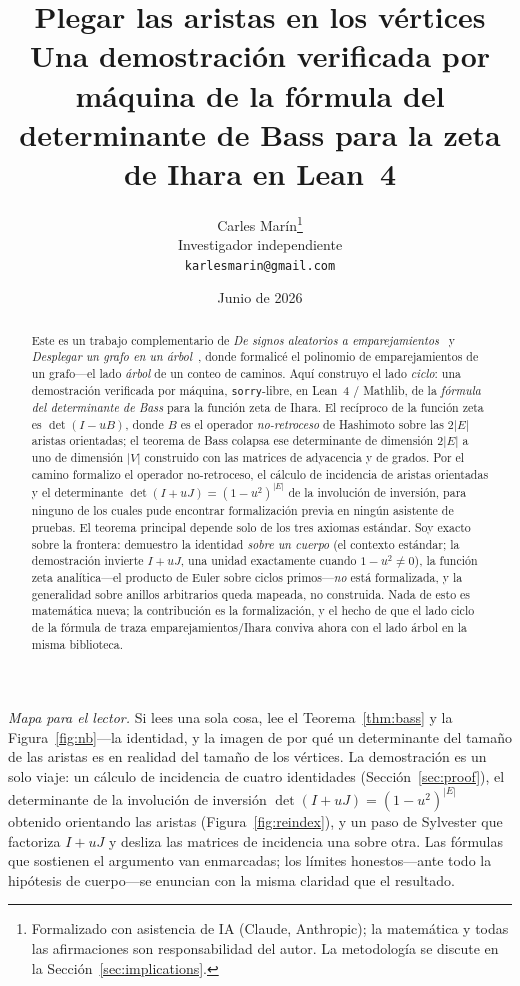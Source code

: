 \documentclass[11pt]{article}
\title{\bf Plegar las aristas en los v\'ertices\\[4pt]
  \large\normalfont Una demostraci\'on verificada por m\'aquina de la f\'ormula del determinante de Bass para la zeta de Ihara en Lean~4}
\author{Carles Mar\'in\thanks{Formalizado con asistencia de IA (Claude, Anthropic); la matem\'atica y todas las afirmaciones son responsabilidad del autor. La metodolog\'ia se discute en la Secci\'on~\ref{sec:implications}.}\\[3pt]
  \normalsize Investigador independiente\\
  \normalsize \texttt{karlesmarin@gmail.com}}
\date{Junio de 2026}
\newcommand{\lean}[1]{\texttt{#1}}
\begin{document}
\maketitle

\begin{abstract}
Este es un trabajo complementario de \emph{De signos aleatorios a emparejamientos}~\cite{PartI} y
\emph{Desplegar un grafo en un \'arbol}~\cite{PartII}, donde formalic\'e el polinomio de
emparejamientos de un grafo---el lado \emph{\'arbol} de un conteo de caminos. Aqu\'i construyo el
lado \emph{ciclo}: una demostraci\'on verificada por m\'aquina, \lean{sorry}-libre, en Lean~4 /
Mathlib, de la \emph{f\'ormula del determinante de Bass} para la funci\'on zeta de Ihara. El
rec\'iproco de la funci\'on zeta es $\det(I-uB)$, donde $B$ es el operador \emph{no-retroceso} de
Hashimoto sobre las $2|E|$ aristas orientadas; el teorema de Bass colapsa ese determinante de
dimensi\'on $2|E|$ a uno de dimensi\'on $|V|$ construido con las matrices de adyacencia y de grados.
Por el camino formalizo el operador no-retroceso, el c\'alculo de incidencia de aristas orientadas y
el determinante $\det(I+uJ)=(1-u^2)^{|E|}$ de la involuci\'on de inversi\'on, para ninguno de los
cuales pude encontrar formalizaci\'on previa en ning\'un asistente de pruebas. El teorema principal
depende solo de los tres axiomas est\'andar. Soy exacto sobre la frontera: demuestro la identidad
\emph{sobre un cuerpo} (el contexto est\'andar; la demostraci\'on invierte $I+uJ$, una unidad
exactamente cuando $1-u^2\neq0$), la funci\'on zeta anal\'itica---el producto de Euler sobre ciclos
primos---\emph{no} est\'a formalizada, y la generalidad sobre anillos arbitrarios queda mapeada, no
construida. Nada de esto es matem\'atica nueva; la contribuci\'on es la formalizaci\'on, y el hecho
de que el lado ciclo de la f\'ormula de traza emparejamientos/Ihara conviva ahora con el lado
\'arbol en la misma biblioteca.
\end{abstract}

\noindent\emph{Mapa para el lector.} Si lees una sola cosa, lee el Teorema~\ref{thm:bass} y la
Figura~\ref{fig:nb}---la identidad, y la imagen de por qu\'e un determinante del tama\~no de las
aristas es en realidad del tama\~no de los v\'ertices. La demostraci\'on es un solo viaje: un c\'alculo de incidencia de
cuatro identidades (Secci\'on~\ref{sec:proof}), el determinante de la involuci\'on de inversi\'on
$\det(I+uJ)=(1-u^2)^{|E|}$ obtenido orientando las aristas (Figura~\ref{fig:reindex}), y un paso de
Sylvester que factoriza $I+uJ$ y desliza las matrices de incidencia una sobre otra. Las f\'ormulas
que sostienen el argumento van enmarcadas; los l\'imites honestos---ante todo la hip\'otesis de
cuerpo---se enuncian con la misma claridad que el resultado.
\end{document}
